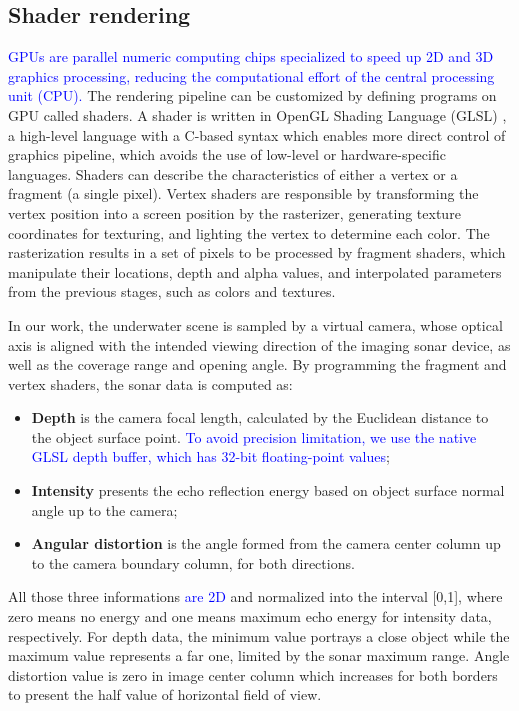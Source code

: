 \documentclass[final,5p,times]{elsarticle}
\begin{document}

\subsection{Shader rendering}
\label{dev:shader}

\textcolor{blue}{GPUs are parallel numeric computing chips specialized to speed up 2D and 3D graphics
processing, reducing the computational effort of the central processing unit (CPU).} The
rendering pipeline can be customized by defining programs on GPU called
shaders. A shader is written in OpenGL Shading Language (GLSL) \cite{rost2009},
a high-level language with a C-based syntax which enables more direct control
of graphics pipeline, which avoids the use of low-level or hardware-specific
languages. Shaders can describe the characteristics of either a vertex or a
fragment (a single pixel). Vertex shaders are responsible by transforming the
vertex position into a screen position by the rasterizer, generating texture
coordinates for texturing, and lighting the vertex to determine each color.
The rasterization results in a set of pixels to be processed by fragment
shaders, which manipulate their locations, depth and alpha values, and
interpolated parameters from the previous stages, such as colors and textures.

In our work, the underwater scene is sampled by a virtual camera, whose
optical axis is aligned with the intended viewing direction of the
imaging sonar device, as well as the coverage range and opening angle.
By programming the fragment and vertex shaders, the sonar data is
computed as:

\begin{itemize}[(a)]
    \item \textbf{Depth} is the camera focal length, calculated by the
    Euclidean distance to the object surface point. \textcolor{blue}{To
    avoid precision limitation, we use the native GLSL depth buffer,
    which has 32-bit floating-point values};
    \item \textbf{Intensity} presents the echo reflection energy based
    on object surface normal angle up to the camera;
    \item \textbf{Angular distortion} is the angle formed from the camera
    center column up to the camera boundary column, for both directions.
\end{itemize}

All those three informations \textcolor{blue}{are 2D} and normalized into the interval [0,1],
where zero means no energy and one means maximum echo energy for
intensity data, respectively. For depth data, the minimum value portrays
a close object while the maximum value represents a far one, limited by
the sonar maximum range. Angle distortion value is zero in image center
column which increases for both borders to present the half value
of horizontal field of view.
\end{document}
